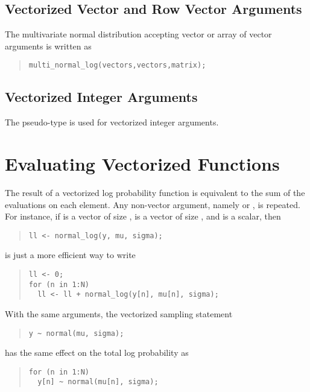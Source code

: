 \subsection{Vectorized Vector and Row Vector Arguments}

The multivariate normal distribution accepting vector or array of
vector arguments is written as
\begin{quote}
\begin{Verbatim}
multi_normal_log(vectors,vectors,matrix);
\end{Verbatim}
\end{quote}

\subsection{Vectorized Integer Arguments}

The pseudo-type  is used for vectorized integer arguments.


\section{Evaluating Vectorized Functions}

The result of a vectorized log probability function is equivalent to
the sum of the evaluations on each element.  Any non-vector argument,
namely  or , is repeated.  For instance, if
 is a vector of size ,  is a vector of size
, and  is a scalar, then
%
\begin{quote}
\begin{Verbatim}
ll <- normal_log(y, mu, sigma);
\end{Verbatim}
\end{quote}
%
is just a more efficient way to write
%
\begin{quote}
\begin{Verbatim}
ll <- 0;
for (n in 1:N)
  ll <- ll + normal_log(y[n], mu[n], sigma);
\end{Verbatim}
\end{quote}
%
With the same arguments, the vectorized sampling statement
%
\begin{quote}
\begin{Verbatim}
y ~ normal(mu, sigma);
\end{Verbatim}
\end{quote}
%
has the same effect on the total log probability as
%
\begin{quote}
\begin{Verbatim}
for (n in 1:N)
  y[n] ~ normal(mu[n], sigma);
\end{Verbatim}
\end{quote}




